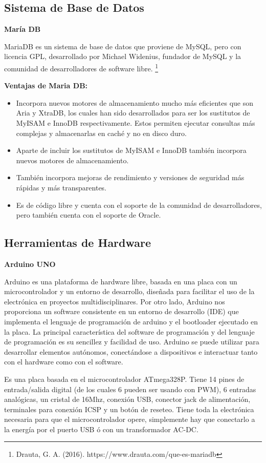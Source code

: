 \documentclass[12pt]{report}%
\begin{document}
\subsection{Sistema de Base de Datos}
\textbf{María DB}

MariaDB es un sistema de base de datos que proviene de MySQL, pero con licencia GPL, desarrollado por Michael Widenius, fundador de MySQL y la comunidad de desarrolladores de software libre. \footnote{Drauta,  G. A. (2016). https://www.drauta.com/que-es-mariadb}

\textbf{Ventajas de Maria DB:}
\begin{itemize}
\item Incorpora nuevos motores de almacenamiento mucho más eficientes que son Aria y XtraDB, los cuales han sido desarrollados para ser los sustitutos de MyISAM e InnoDB respectivamente. Estos permiten ejecutar consultas más complejas y almacenarlas en caché y no en disco duro.
\item Aparte de incluir los sustitutos de MyISAM e InnoDB también incorpora nuevos motores de almacenamiento.
\item También incorpora mejoras de rendimiento y versiones de seguridad más rápidas y más transparentes.
\item Es de código libre y cuenta con el soporte de la comunidad de desarrolladores, pero también cuenta con el soporte de Oracle.
\end{itemize}


\subsection{Herramientas de Hardware}

\textbf{Arduino UNO}

Arduino es una plataforma de hardware libre, basada en una placa con un microcontrolador y un entorno de desarrollo, diseñada para facilitar el uso de la electrónica en proyectos multidisciplinares. Por otro lado, Arduino nos proporciona un software consistente en un entorno de desarrollo (IDE) que implementa el lenguaje de programación de arduino y el bootloader ejecutado en la placa. La principal característica del software de programación y del lenguaje de programación es su sencillez y facilidad de uso. Arduino se puede utilizar para desarrollar elementos autónomos, conectándose a dispositivos e interactuar tanto con el hardware como con el software.

Es una placa basada en el microcontrolador ATmega328P. Tiene 14 pines de entrada/salida digital (de los cuales 6 pueden ser usando con PWM), 6 entradas analógicas, un cristal de 16Mhz, conexión USB, conector jack de alimentación, terminales para conexión ICSP y un botón de reseteo. Tiene toda la electrónica necesaria para que el microcontrolador opere, simplemente hay que conectarlo a la energía por el puerto USB ó con un transformador AC-DC.
\end{document}
